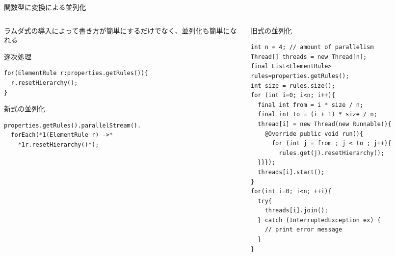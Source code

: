 \begin{frame}[fragile]{関数型に変換による並列化}
\begin{columns}
\begin{column}{0.57\textwidth}
ラムダ式の導入によって書き方が簡単にするだけでなく、並列化も簡単になれる
\begin{block}{逐次処理}
\begin{lstlisting}
for(ElementRule r:properties.getRules()){
  r.resetHierarchy();
}
\end{lstlisting}
\end{block}
\begin{block}{新式の並列化}
\begin{lstlisting}[morekeywords={parallelStream, forEach},moredelim={**[is][{\btHL}]{*1}{*}}]
properties.getRules().parallelStream().
  forEach(*1(ElementRule r) ->*
    *1r.resetHierarchy()*);
\end{lstlisting}
\end{block}
\end{column}
\begin{column}{0.4\textwidth}
\begin{block}{旧式の並列化}
\begin{lstlisting}[basicstyle=\tiny]
int n = 4; // amount of parallelism
Thread[] threads = new Thread[n];
final List<ElementRule> rules=properties.getRules();
int size = rules.size();
for (int i=0; i<n; i++){
  final int from = i * size / n;
  final int to = (i + 1) * size / n;
  thread[i] = new Thread(new Runnable(){
    @Override public void run(){
      for (int j = from ; j < to ; j++){
        rules.get(j).resetHierarchy();
  }}});
  threads[i].start();
}
for(int i=0; i<n; ++i){
  try{
    threads[i].join();
  } catch (InterruptedException ex) {
    // print error message
  }
}
\end{lstlisting}
\end{block}
\end{column}
\end{columns}
\end{frame}

